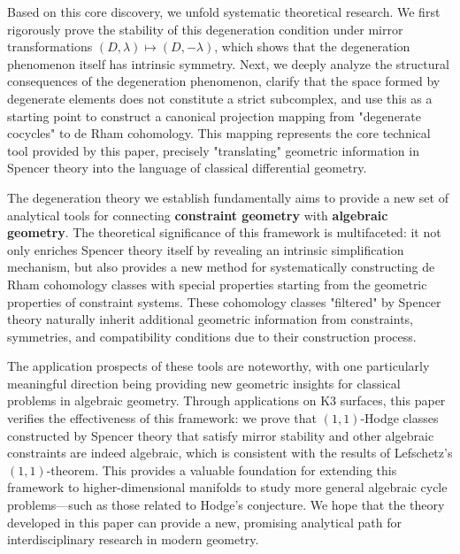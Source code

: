 \documentclass[a4paper,12pt]{extarticle}
\theoremstyle{plain}
\theoremstyle{definition}
\begin{document}
Based on this core discovery, we unfold systematic theoretical research. We first rigorously prove the stability of this degeneration condition under mirror transformations $(D,\lambda)\mapsto(D,-\lambda)$, which shows that the degeneration phenomenon itself has intrinsic symmetry. Next, we deeply analyze the structural consequences of the degeneration phenomenon, clarify that the space formed by degenerate elements does not constitute a strict subcomplex, and use this as a starting point to construct a canonical projection mapping from "degenerate cocycles" to de Rham cohomology. This mapping represents the core technical tool provided by this paper, precisely "translating" geometric information in Spencer theory into the language of classical differential geometry.

The degeneration theory we establish fundamentally aims to provide a new set of analytical tools for connecting \textbf{constraint geometry} with \textbf{algebraic geometry}. The theoretical significance of this framework is multifaceted: it not only enriches Spencer theory itself by revealing an intrinsic simplification mechanism, but also provides a new method for systematically constructing de Rham cohomology classes with special properties starting from the geometric properties of constraint systems. These cohomology classes "filtered" by Spencer theory naturally inherit additional geometric information from constraints, symmetries, and compatibility conditions due to their construction process.

The application prospects of these tools are noteworthy, with one particularly meaningful direction being providing new geometric insights for classical problems in algebraic geometry. Through applications on K3 surfaces\cite{Beauville1983, Barth1984}, this paper verifies the effectiveness of this framework: we prove that $(1,1)$-Hodge classes constructed by Spencer theory that satisfy mirror stability and other algebraic constraints are indeed algebraic, which is consistent with the results of Lefschetz's $(1,1)$-theorem\cite{Lefschetz1924, Griffiths1969}. This provides a valuable foundation for extending this framework to higher-dimensional manifolds to study more general algebraic cycle problems—such as those related to Hodge's conjecture. We hope that the theory developed in this paper can provide a new, promising analytical path for interdisciplinary research in modern geometry.
\end{document}
